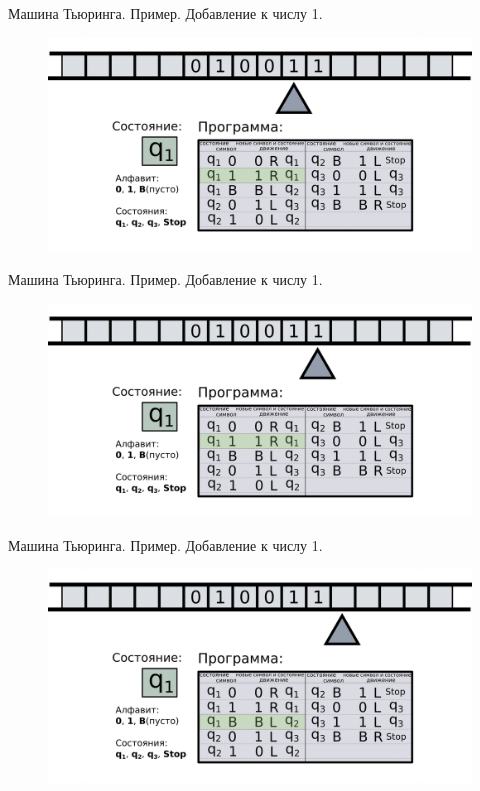 \documentclass[newPxFont]{beamer}
\begin{document}
\begin{frame}{Машина Тьюринга. Пример. Добавление к числу 1.}
	\begin{figure}
		\centerline{\includegraphics[width=1.5\linewidth]{images/tm_ex_6.png}}
	\end{figure}
\end{frame}

\begin{frame}{Машина Тьюринга. Пример. Добавление к числу 1.}
	\begin{figure}
		\centerline{\includegraphics[width=1.5\linewidth]{images/tm_ex_7.png}}
	\end{figure}
\end{frame}

\begin{frame}{Машина Тьюринга. Пример. Добавление к числу 1.}
	\begin{figure}
		\centerline{\includegraphics[width=1.5\linewidth]{images/tm_ex_8.png}}
	\end{figure}
\end{frame}
\end{document}
